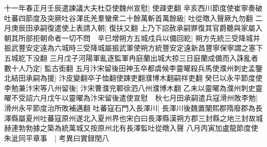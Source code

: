 十一年春正月壬辰遣諫議大夫杜亞使魏州宣慰|{
	使疎吏翻}
辛亥西川節度使崔寧奏破吐蕃四節度及突厥吐谷渾氐羌羣蠻衆二十餘萬斬首萬餘級|{
	吐從暾入聲厥九勿翻}
二月庚辰田承嗣復遣使上表請入朝|{
	復扶又翻}
上乃下詔赦承嗣罪復其官爵聽與家屬入朝其所部拒朝命者一切不問　辛巳增朔方五城戍兵以備回紇|{
	朔方先統三受降城并振武豐安定遠為六城時三受降城屬振武軍使朔方統豐安定遠新昌豐寧保寧謂之塞下五城紇下没翻}
三月戊子河陽軍亂逐監軍冉庭蘭出城大掠三日庭蘭成備而入誅亂者數十人乃定|{
	監古銜翻}
五月汴宋留後田神玉卒都虞候李靈曜殺兵馬使濮州刺史孟鑒北結田承嗣為援|{
	汴皮變翻卒子恤翻使踈吏翻濮博木翻嗣祥吏翻}
癸巳以永平節度使李勉兼汴宋等八州留後|{
	汴宋曹濮兖鄆徐泗八州濮博木翻}
乙未以靈曜為濮州刺史靈曜不受詔六月戊午以靈曜為汴宋留後遣使宣慰　秋七月田承嗣遣兵寇滑州敗李勉|{
	滑州永平節度治所敗補邁翻}
吐蕃寇石門入長澤川|{
	長澤川後魏置闡熙郡隋廢郡為長澤縣屬夏州吐蕃寇原州遂北入夏州界也宋白曰長澤縣漢朔方郡三封縣之地三封故城赫連勃勃據之築為統萬城又按原州北有長澤監吐從暾入聲}
八月丙寅加盧龍節度使朱泚同平章事　|{
	考異曰實録閏八}


